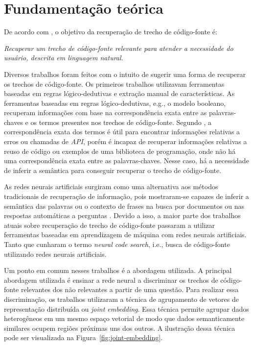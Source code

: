 \chapter{Fundamentação teórica}
\label{cap:fundamentacao-teorica}

De acordo com \cite{Chen-bi-variational-autoencoder:2018}, o objetivo da recuperação de trecho de código-fonte é:

\emph{Recuperar um trecho de código-fonte relevante para atender a necessidade do usuário, descrita em linguagem natural.}

Diversos trabalhos foram feitos com o intuito de sugerir uma forma de recuperar os trechos de código-fonte. Os primeiros trabalhos utilizavam ferramentas baseadas em regras lógico-dedutivas e extração manual de características. As ferramentas baseadas em regras lógico-dedutivas, e.g., o modelo booleano, recuperam informações com base na correspondência exata entre as palavras-chaves e os termos presentes nos trechos de código-fonte. Segundo \cite{yan-benchmark-code-search-information-retrieval-deep-learning:2020}, a correspondência exata dos termos é útil para encontrar informações relativas a erros ou chamadas de \textit{API}, porém é incapaz de recuperar informações relativas a reuso de código ou exemplos de uma biblioteca de programação, onde não há uma correspondência exata entre as palavras-chaves. Nesse caso, há a necessidade de inferir a semântica para conseguir recuperar o trecho de código-fonte.

As redes neurais artificiais surgiram como uma alternativa aos métodos tradicionais de recuperação de informação, pois mostraram-se capazes de inferir a semântica das palavras ou o contexto de frases na busca por documentos ou nas respostas automáticas a perguntas \citep{guo-deep-look-into-neural-ranking-models:2019}. Devido a isso, a maior parte dos trabalhos atuais sobre recuperação de trecho de código-fonte passaram a utilizar ferramentas baseadas em aprendizagem de máquina com redes neurais artificiais. Tanto que \cite{cambronero-deep-learning-code-search:2019} cunharam o termo \textit{neural code search}, i.e., busca de código-fonte utilizando redes neurais artificiais. 

Um ponto em comum nesses trabalhos é a abordagem utilizada. A principal abordagem utilizada é ensinar a rede neural a discriminar os trechos de código-fonte relevantes dos não relevantes a partir de uma questão. Para realizar essa discriminação, os trabalhos utilizaram a técnica de agrupamento de vetores de representação distribuída ou \textit{joint embedding}. Essa técnica permite agrupar dados heterogêneos em um mesmo espaço vetorial de modo que dados semanticamente similares ocupem regiões próximas uns dos outros. A ilustração dessa técnica pode ser visualizada na Figura~\ref{fig:joint-embedding}.

